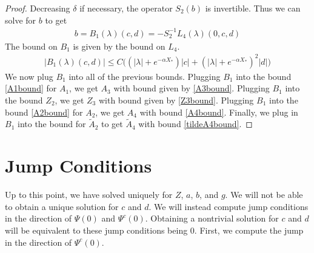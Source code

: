\documentclass[thesis.tex]{subfiles}
\begin{document}
\begin{lemma}
\begin{proof}
Decreasing $\delta$ if necessary, the operator $S_2(b)$ is invertible. Thus we can solve for $b$ to get
\begin{align}
b = B_1(\lambda)(c,d) 
= -S_2^{-1} L_4(\lambda)(0, c, d)
\end{align}
The bound on $B_1$ is given by the bound on $L_4$.
\begin{align*}
|B_1(\lambda)(c, d)| \leq C\Big( (|\lambda| + e^{-\alpha X_*})|c| + (|\lambda| + e^{-\alpha X_*})^2 |d| \Big) 
\end{align*}
We now plug $B_1$ into all of the previous bounds. Plugging $B_1$ into the bound \eqref{A1bound} for $A_1$, we get $A_3$ with bound given by \cref{A3bound}. Plugging $B_1$ into the bound $Z_2$, we get $Z_3$ with bound given by \cref{Z3bound}. Plugging $B_1$ into the bound \eqref{A2bound} for $A_2$, we get $A_4$ with bound \cref{A4bound}. Finally, we plug in $B_1$ into the bound for $\tilde{A}_2$ to get $\tilde{A}_4$ with bound \cref{tildeA4bound}.
\end{proof}
\end{lemma}

\section{Jump Conditions}

Up to this point, we have solved uniquely for $Z$, $a$, $b$, and $g$. We will not be able to obtain a unique solution for $c$ and $d$. We will instead compute jump conditions in the direction of $\Psi(0)$ and $\Psi^c(0)$. Obtaining a nontrivial solution for $c$ and $d$ will be equivalent to these jump conditions being 0. First, we compute the jump in the direction of $\Psi^c(0)$. 
\end{document}
